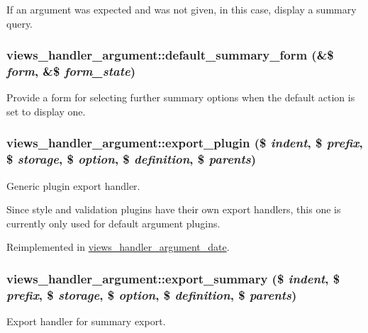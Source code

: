 If an argument was expected and was not given, in this case, display a summary query. \hypertarget{classviews__handler__argument_a2153c4a0abfeafc8b610513367088355}{
\subsubsection[{default\_\-summary\_\-form}]{\setlength{\rightskip}{0pt plus 5cm}views\_\-handler\_\-argument::default\_\-summary\_\-form (\&\$ {\em form}, \/  \&\$ {\em form\_\-state})}}
\label{classviews__handler__argument_a2153c4a0abfeafc8b610513367088355}
Provide a form for selecting further summary options when the default action is set to display one. \hypertarget{classviews__handler__argument_abf6991bce1b9311bbfc3d471df49434e}{
\subsubsection[{export\_\-plugin}]{\setlength{\rightskip}{0pt plus 5cm}views\_\-handler\_\-argument::export\_\-plugin (\$ {\em indent}, \/  \$ {\em prefix}, \/  \$ {\em storage}, \/  \$ {\em option}, \/  \$ {\em definition}, \/  \$ {\em parents})}}
\label{classviews__handler__argument_abf6991bce1b9311bbfc3d471df49434e}
Generic plugin export handler.

Since style and validation plugins have their own export handlers, this one is currently only used for default argument plugins. 

Reimplemented in \hyperlink{classviews__handler__argument__date_aa4fe15a71439766a9915a47277615873}{views\_\-handler\_\-argument\_\-date}.\hypertarget{classviews__handler__argument_ad0747dc00a5a67a32550c8fa2508c31d}{
\subsubsection[{export\_\-summary}]{\setlength{\rightskip}{0pt plus 5cm}views\_\-handler\_\-argument::export\_\-summary (\$ {\em indent}, \/  \$ {\em prefix}, \/  \$ {\em storage}, \/  \$ {\em option}, \/  \$ {\em definition}, \/  \$ {\em parents})}}
\label{classviews__handler__argument_ad0747dc00a5a67a32550c8fa2508c31d}
Export handler for summary export.

